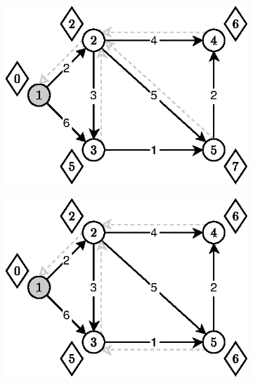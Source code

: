 \begin{figure}[!htbp]
\begin{subfigure}[b]{0.24\textwidth}
		\includegraphics[width=\textwidth]{Chapter_I/11/1_11c.eps}
		\caption{}
	\end{subfigure}%
	\begin{subfigure}[b]{0.24\textwidth}
		\includegraphics[width=\textwidth]{Chapter_I/11/1_11d.eps}
		\caption{}
		\label{fig:exampleBellmanFord:d}
	\end{subfigure}

\end{figure}
